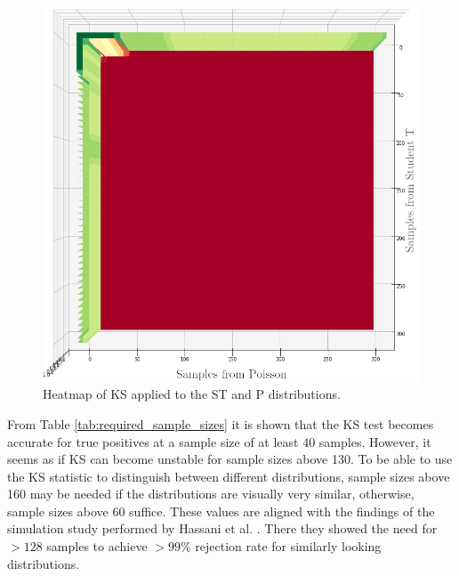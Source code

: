 \begin{figure}[h]
  \centering
  \includegraphics[width=\linewidth]{./img/hypothesis_test/deepar_heatmap_Y_student_t_X_poisson_ks_edited.png}
  \endminipage
  \caption{Heatmap of KS applied to the ST and P distributions.}
  \label{ks_student_t_poisson}
\end{figure}
\clearpage

From Table \ref{tab:required_sample_sizes} it is shown that the KS test becomes accurate for true positives at a sample size of at least 40 samples. However, it seems as if KS can become unstable for sample sizes above 130. To be able to use the KS statistic to distinguish between different distributions, sample sizes above 160 may be needed if the distributions are visually very similar, otherwise, sample sizes above \(60\) suffice. These values are aligned with the findings of the simulation study performed by Hassani et al. \cite{hassani2015kolmogorov}. There they showed the need for \(>128\) samples to achieve \(>99\)\% rejection rate for similarly looking distributions.

